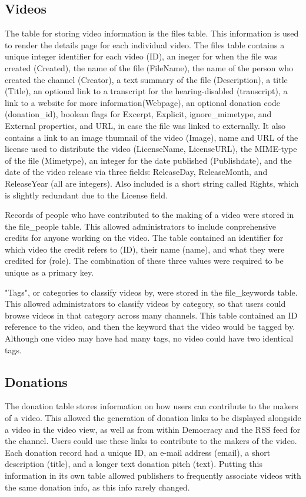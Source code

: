 \documentclass[a4paper,12pt]{report}
\begin{document}
\subsection{Videos}
The table for storing video information is the files table. This information is used to render the details page for each individual video. The files table contains a unique integer identifier for each video (ID), an ineger for when the file was created (Created), the name of the file (FileName), the name of the person who created the channel (Creator), a text summary of the file (Description), a title (Title), an optional link to a transcript for the hearing-disabled (transcript), a link to a website for more information(Webpage), an optional donation code (donation\_id), boolean flags for Excerpt, Explicit, ignore\_mimetype, and External properties, and URL, in case the file was linked to externally. It also contains a link to an image thumnail of the video (Image), name and URL of the license used to distribute the video (LicenseName, LicenseURL), the MIME-type of the file (Mimetype), an integer for the date published (Publishdate), and the date of the video release via three fields: ReleaseDay, ReleaseMonth, and ReleaseYear (all are integers). Also included is a short string called Rights, which is slightly redundant due to the License field. 


Records of people who have contributed to the making of a video were stored in the file\_people table. This allowed administrators to include conprehensive credits for anyone working on the video. The table contained an identifier for which video the credit refers to (ID), their name (name), and what they were credited for (role). The combination of these three values were required to be unique as a primary key.


"Tags", or categories to classify videos by, were stored in the file\_keywords table. This allowed administrators to classify videos by category, so that users could browse videos in that category across many channels. This table contained an ID reference to the video, and then the keyword that the video would be tagged by. Although one video may have had many tags, no video could have two identical tags.


\subsection{Donations}
The donation table stores information on how users can contribute to the makers of a video. This allowed the generation of donation links to be displayed alongside a video in the video view, as well as from within Democracy and the RSS feed for the channel. Users could use these links to contribute to the makers of the video. Each donation record had a unique ID, an e-mail address (email), a short description (title), and a longer text donation pitch (text). Putting this information in its own table allowed publishers to frequently associate videos with the same donation info, as this info rarely changed. 
\end{document}

